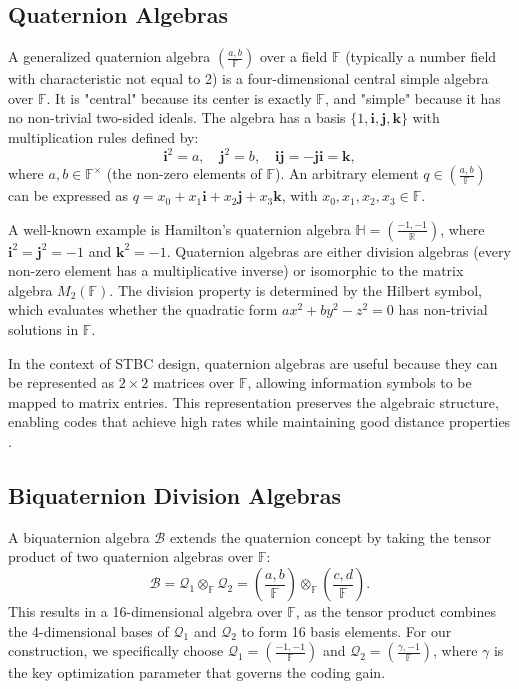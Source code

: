\documentclass[twocolumn,conference]{IEEEtran}
\begin{document}
\subsection{Quaternion Algebras}

A generalized quaternion algebra $\left(\frac{a, b}{\mathbb{F}}\right)$ over a field $\mathbb{F}$ (typically a number field with characteristic not equal to 2) is a four-dimensional central simple algebra over $\mathbb{F}$. It is "central" because its center is exactly $\mathbb{F}$, and "simple" because it has no non-trivial two-sided ideals. The algebra has a basis $\{1, \mathbf{i}, \mathbf{j}, \mathbf{k}\}$ with multiplication rules defined by:
\begin{equation}
\mathbf{i}^2 = a, \quad \mathbf{j}^2 = b, \quad \mathbf{ij} = -\mathbf{ji} = \mathbf{k},
\end{equation}
where $a, b \in \mathbb{F}^\times$ (the non-zero elements of $\mathbb{F}$). An arbitrary element $q \in \left(\frac{a, b}{\mathbb{F}}\right)$ can be expressed as $q = x_0 + x_1 \mathbf{i} + x_2 \mathbf{j} + x_3 \mathbf{k}$, with $x_0, x_1, x_2, x_3 \in \mathbb{F}$.

A well-known example is Hamilton's quaternion algebra $\mathbb{H} = \left(\frac{-1, -1}{\mathbb{R}}\right)$, where $\mathbf{i}^2 = \mathbf{j}^2 = -1$ and $\mathbf{k}^2 = -1$. Quaternion algebras are either division algebras (every non-zero element has a multiplicative inverse) or isomorphic to the matrix algebra $M_2(\mathbb{F})$. The division property is determined by the Hilbert symbol, which evaluates whether the quadratic form $a x^2 + b y^2 - z^2 = 0$ has non-trivial solutions in $\mathbb{F}$.

In the context of STBC design, quaternion algebras are useful because they can be represented as $2 \times 2$ matrices over $\mathbb{F}$, allowing information symbols to be mapped to matrix entries. This representation preserves the algebraic structure, enabling codes that achieve high rates while maintaining good distance properties \cite{3}.

\subsection{Biquaternion Division Algebras}

A biquaternion algebra $\mathcal{B}$ extends the quaternion concept by taking the tensor product of two quaternion algebras over $\mathbb{F}$:
\begin{equation}
\mathcal{B} = \mathcal{Q}_1 \otimes_{\mathbb{F}} \mathcal{Q}_2 = \left(\frac{a, b}{\mathbb{F}}\right) \otimes_{\mathbb{F}} \left(\frac{c, d}{\mathbb{F}}\right).
\end{equation}
This results in a 16-dimensional algebra over $\mathbb{F}$, as the tensor product combines the 4-dimensional bases of $\mathcal{Q}_1$ and $\mathcal{Q}_2$ to form 16 basis elements. For our construction, we specifically choose $\mathcal{Q}_1 = \left(\frac{-1, -1}{\mathbb{F}}\right)$ and $\mathcal{Q}_2 = \left(\frac{\gamma, -1}{\mathbb{F}}\right)$, where $\gamma$ is the key optimization parameter that governs the coding gain.
\end{document}
